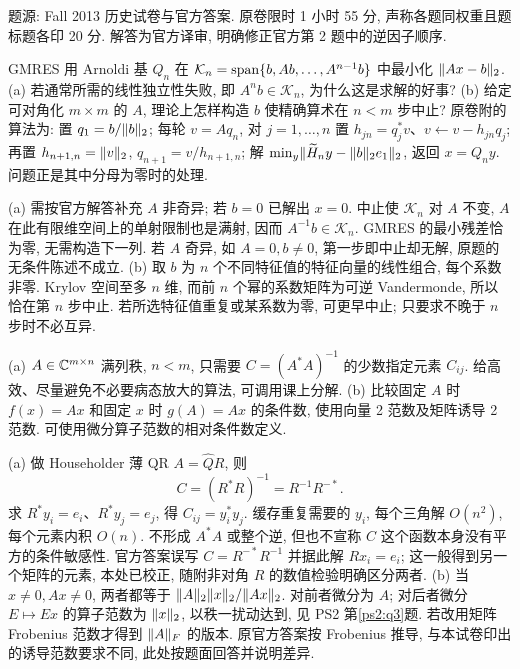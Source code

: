 题源: Fall 2013 历史试卷与官方答案. 原卷限时 1 小时 55 分, 声称各题同权重且题标题各印 20 分. 解答为官方译审, 明确修正官方第 2 题中的逆因子顺序.
\begin{exercise}\label{e2013:q1}
GMRES 用 Arnoldi 基 $Q_n$ 在 $\mathcal K_n=\operatorname{span}\{b,Ab,\ldots,A^{n-1}b\}$ 中最小化 $\lVert Ax-b\rVert_2$.
(a) 若通常所需的线性独立性失败, 即 $A^nb\in\mathcal K_n$, 为什么这是求解的好事?
(b) 给定可对角化 $m\times m$ 的 $A$, 理论上怎样构造 $b$ 使精确算术在 $n<m$ 步中止? 原卷附的算法为: 置 $q_1=b/\lVert b\rVert_2$; 每轮 $v=Aq_n$, 对 $j=1,\ldots,n$ 置 $h_{jn}=q_j^*v$、$v\leftarrow v-h_{jn}q_j$; 再置 $h_{n+1,n}=\lVert v\rVert_2$, $q_{n+1}=v/h_{n+1,n}$; 解 $\min_y\lVert \widetilde H_ny-\lVert b\rVert_2e_1\rVert_2$, 返回 $x=Q_ny$. 问题正是其中分母为零时的处理.
\end{exercise}
\begin{solution}
(a) 需按官方解答补充 $A$ 非奇异; 若 $b=0$ 已解出 $x=0$. 中止使 $\mathcal K_n$ 对 $A$ 不变, $A$ 在此有限维空间上的单射限制也是满射, 因而 $A^{-1}b\in\mathcal K_n$. GMRES 的最小残差恰为零, 无需构造下一列. 若 $A$ 奇异, 如 $A=0,b\ne0$, 第一步即中止却无解, 原题的无条件陈述不成立.
(b) 取 $b$ 为 $n$ 个不同特征值的特征向量的线性组合, 每个系数非零. Krylov 空间至多 $n$ 维, 而前 $n$ 个幂的系数矩阵为可逆 Vandermonde, 所以恰在第 $n$ 步中止. 若所选特征值重复或某系数为零, 可更早中止; 只要求不晚于 $n$ 步时不必互异.
\end{solution}
\begin{exercise}\label{e2013:q2}
(a) $A\in\mathbb C^{m\times n}$ 满列秩, $n<m$, 只需要 $C=(A^*A)^{-1}$ 的少数指定元素 $C_{ij}$. 给高效、尽量避免不必要病态放大的算法, 可调用课上分解.
(b) 比较固定 $A$ 时 $f(x)=Ax$ 和固定 $x$ 时 $g(A)=Ax$ 的条件数, 使用向量 2 范数及矩阵诱导 2 范数. 可使用微分算子范数的相对条件数定义.
\end{exercise}
\begin{solution}
(a) 做 Householder 薄 QR $A=\widehat QR$, 则
\[
 C=(R^*R)^{-1}=R^{-1}R^{-*}.
\]
求 $R^*y_i=e_i$、$R^*y_j=e_j$, 得 $C_{ij}=y_i^*y_j$. 缓存重复需要的 $y_i$, 每个三角解 $O(n^2)$, 每个元素内积 $O(n)$. 不形成 $A^*A$ 或整个逆, 但也不宣称 $C$ 这个函数本身没有平方的条件敏感性. 官方答案误写 $C=R^{-*}R^{-1}$ 并据此解 $Rx_i=e_i$; 这一般得到另一个矩阵的元素, 本处已校正, 随附非对角 $R$ 的数值检验明确区分两者.
(b) 当 $x\ne0,Ax\ne0$, 两者都等于 $\lVert A\rVert_2\lVert x\rVert_2/\lVert Ax\rVert_2$. 对前者微分为 $A$; 对后者微分 $E\mapsto Ex$ 的算子范数为 $\lVert x\rVert_2$, 以秩一扰动达到, 见 PS2 第\ref{ps2:q3}题. 若改用矩阵 Frobenius 范数才得到 $\lVert A\rVert_F$ 的版本. 原官方答案按 Frobenius 推导, 与本试卷印出的诱导范数要求不同, 此处按题面回答并说明差异.
\end{solution}
